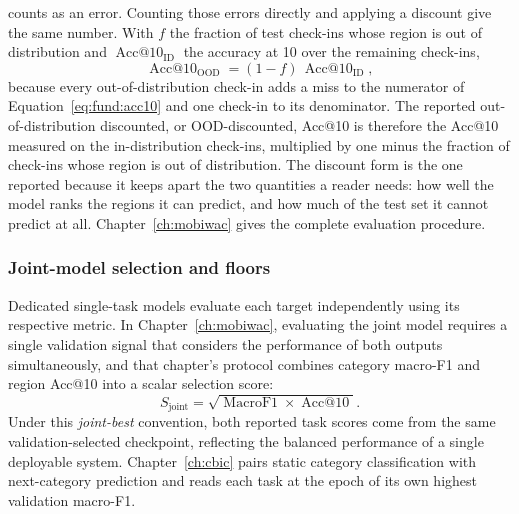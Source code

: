 counts as an error. Counting those errors directly and applying a discount give the same
number. With $f$ the fraction of test check-ins whose region is out of distribution and
$\operatorname{Acc@10}_{\mathrm{ID}}$ the accuracy at 10 over the remaining check-ins,
\begin{equation}\label{eq:fund:acc10-ood}
    \operatorname{Acc@10}_{\mathrm{OOD}} = (1-f)\,\operatorname{Acc@10}_{\mathrm{ID}},
\end{equation}
because every out-of-distribution check-in adds a miss to the numerator of
Equation~\ref{eq:fund:acc10} and one check-in to its denominator. The reported
out-of-distribution discounted, or OOD-discounted, Acc@10 is therefore the Acc@10
measured on the in-distribution check-ins, multiplied by one minus the fraction of
check-ins whose region is out of distribution. The discount form is the one reported
because it keeps apart the two quantities a reader needs: how well the model ranks the
regions it can predict, and how much of the test set it cannot predict at all.
Chapter~\ref{ch:mobiwac} gives the complete evaluation procedure.

\subsubsection{Joint-model selection and floors}

Dedicated single-task models evaluate each target independently using its respective
metric. In Chapter~\ref{ch:mobiwac}, evaluating the joint model requires a single
validation signal that considers the performance of both outputs simultaneously, and
that chapter's protocol combines category macro-F1 and region Acc@10 into a scalar
selection score:
\begin{equation}\label{eq:fund:joint-selection}
    S_{\mathrm{joint}} = \sqrt{\operatorname{MacroF1} \times \operatorname{Acc@10}}.
\end{equation}
Under this \emph{joint-best} convention, both reported task scores come from the same
validation-selected checkpoint, reflecting the balanced performance of a single
deployable system. Chapter~\ref{ch:cbic} pairs static category classification with
next-category prediction and reads each task at the
epoch of its own highest validation macro-F1.

